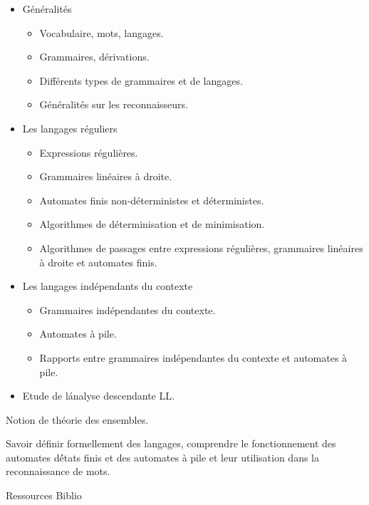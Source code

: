 {
\begin{itemize} 
\item Généralités
  \begin{itemize} 
  \item Vocabulaire, mots, langages.
  \item Grammaires, dérivations.
  \item Différents types de grammaires et de langages.
  \item Généralités sur les reconnaisseurs.
  \end{itemize} 
\item Les langages réguliers
  \begin{itemize} 
  \item Expressions régulières.
  \item Grammaires linéaires à droite.
  \item Automates finis non-déterministes et déterministes.
  \item Algorithmes de déterminisation et de minimisation.
  \item Algorithmes de passages entre expressions régulières, grammaires linéaires à droite et automates finis.
  \end{itemize} 
\item Les langages indépendants du contexte
  \begin{itemize} 
  \item Grammaires indépendantes du contexte.
  \item Automates à pile.
  \item Rapports entre grammaires indépendantes du contexte et automates à pile.
  \end{itemize} 
\item Etude de l\'analyse descendante LL.
\end{itemize} 
} 
{Notion de théorie des ensembles.} 
{\begin{itemize} 
  \ObjItem Savoir définir formellement des langages, comprendre le fonctionnement
des automates d\'états finis et des automates à pile et leur utilisation dans la reconnaissance de mots.
\end{itemize} 
} 
{Ressources} 
{Biblio} 
 
